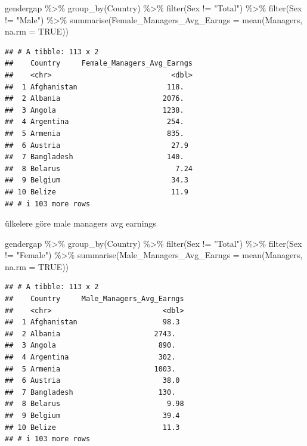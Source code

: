 \documentclass[
]{article}
\newenvironment{Shaded}{\begin{snugshade}}{\end{snugshade}}
\newcommand{\AttributeTok}[1]{\textcolor[rgb]{0.77,0.63,0.00}{#1}}
\newcommand{\ConstantTok}[1]{\textcolor[rgb]{0.00,0.00,0.00}{#1}}
\newcommand{\FunctionTok}[1]{\textcolor[rgb]{0.00,0.00,0.00}{#1}}
\newcommand{\NormalTok}[1]{#1}
\newcommand{\SpecialCharTok}[1]{\textcolor[rgb]{0.00,0.00,0.00}{#1}}
\newcommand{\StringTok}[1]{\textcolor[rgb]{0.31,0.60,0.02}{#1}}
\begin{document}
\begin{Shaded}
\begin{Highlighting}[]
\NormalTok{gendergap }\SpecialCharTok{\%\textgreater{}\%}
  \FunctionTok{group\_by}\NormalTok{(Country) }\SpecialCharTok{\%\textgreater{}\%} 
   \FunctionTok{filter}\NormalTok{(Sex }\SpecialCharTok{!=} \StringTok{"Total"}\NormalTok{) }\SpecialCharTok{\%\textgreater{}\%}
  \FunctionTok{filter}\NormalTok{(Sex }\SpecialCharTok{!=} \StringTok{"Male"}\NormalTok{) }\SpecialCharTok{\%\textgreater{}\%}
  \FunctionTok{summarise}\NormalTok{(}\AttributeTok{Female\_Managers\_Avg\_Earngs =} \FunctionTok{mean}\NormalTok{(Managers, }\AttributeTok{na.rm =} \ConstantTok{TRUE}\NormalTok{))}
\end{Highlighting}
\end{Shaded}

\begin{verbatim}
## # A tibble: 113 x 2
##    Country     Female_Managers_Avg_Earngs
##    <chr>                            <dbl>
##  1 Afghanistan                     118.  
##  2 Albania                        2076.  
##  3 Angola                         1238.  
##  4 Argentina                       254.  
##  5 Armenia                         835.  
##  6 Austria                          27.9 
##  7 Bangladesh                      140.  
##  8 Belarus                           7.24
##  9 Belgium                          34.3 
## 10 Belize                           11.9 
## # i 103 more rows
\end{verbatim}

ülkelere göre male managers avg earnings

\begin{Shaded}
\begin{Highlighting}[]
\NormalTok{gendergap }\SpecialCharTok{\%\textgreater{}\%}
  \FunctionTok{group\_by}\NormalTok{(Country) }\SpecialCharTok{\%\textgreater{}\%} 
   \FunctionTok{filter}\NormalTok{(Sex }\SpecialCharTok{!=} \StringTok{"Total"}\NormalTok{) }\SpecialCharTok{\%\textgreater{}\%}
  \FunctionTok{filter}\NormalTok{(Sex }\SpecialCharTok{!=} \StringTok{"Female"}\NormalTok{) }\SpecialCharTok{\%\textgreater{}\%}
  \FunctionTok{summarise}\NormalTok{(}\AttributeTok{Male\_Managers\_Avg\_Earngs =} \FunctionTok{mean}\NormalTok{(Managers, }\AttributeTok{na.rm =} \ConstantTok{TRUE}\NormalTok{))}
\end{Highlighting}
\end{Shaded}

\begin{verbatim}
## # A tibble: 113 x 2
##    Country     Male_Managers_Avg_Earngs
##    <chr>                          <dbl>
##  1 Afghanistan                    98.3 
##  2 Albania                      2743.  
##  3 Angola                        890.  
##  4 Argentina                     302.  
##  5 Armenia                      1003.  
##  6 Austria                        38.0 
##  7 Bangladesh                    130.  
##  8 Belarus                         9.98
##  9 Belgium                        39.4 
## 10 Belize                         11.3 
## # i 103 more rows
\end{verbatim}
\end{document}
